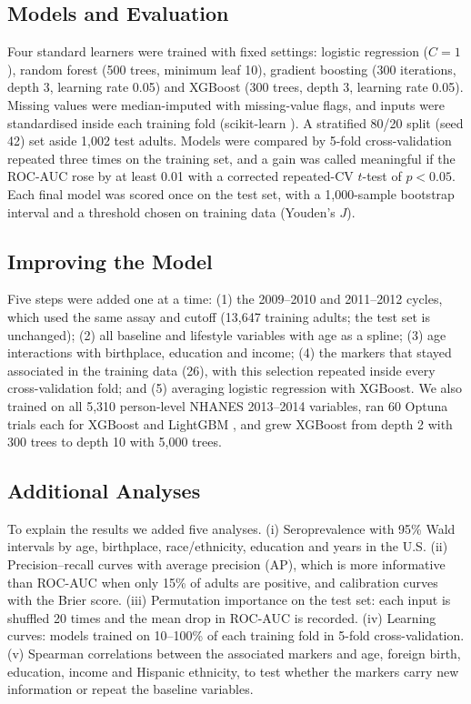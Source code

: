 \documentclass[conference]{IEEEtran}
\begin{document}
\subsection{Models and Evaluation}
Four standard learners were trained with fixed settings: logistic regression ($C=1$), random forest (500 trees, minimum leaf 10),
gradient boosting (300 iterations, depth 3, learning rate 0.05) and XGBoost \cite{xgboost} (300 trees, depth 3, learning rate 0.05).
Missing values were median-imputed with missing-value flags, and inputs were standardised inside each training fold (scikit-learn
\cite{sklearn}). A stratified 80/20 split (seed 42) set aside 1,002 test adults. Models were compared by 5-fold cross-validation
repeated three times on the training set, and a gain was called meaningful if the ROC-AUC rose by at least 0.01 with a corrected
repeated-CV $t$-test \cite{nadeau2003} of $p<0.05$. Each final model was scored once on the test set, with a 1,000-sample bootstrap
interval and a threshold chosen on training data (Youden's $J$).

\subsection{Improving the Model}
Five steps were added one at a time: (1) the 2009--2010 and 2011--2012 cycles, which used the same assay and cutoff (13,647 training
adults; the test set is unchanged); (2) all baseline and lifestyle variables with age as a spline; (3) age interactions with
birthplace, education and income; (4) the markers that stayed associated in the training data (26), with this selection
repeated inside every cross-validation fold; and (5) averaging logistic regression with XGBoost. We also trained on all 5,310 person-level NHANES 2013--2014 variables, ran 60 Optuna \cite{optuna} trials each for
XGBoost and LightGBM \cite{lightgbm}, and grew XGBoost from depth 2 with 300 trees to depth 10 with 5,000 trees.

\subsection{Additional Analyses}
To explain the results we added five analyses. (i) Seroprevalence with 95\% Wald intervals by age, birthplace, race/ethnicity,
education and years in the U.S. (ii) Precision--recall curves with average precision (AP), which is more informative than ROC-AUC when
only 15\% of adults are positive, and calibration curves with the Brier score. (iii) Permutation importance on the test set: each input
is shuffled 20 times and the mean drop in ROC-AUC is recorded. (iv) Learning curves: models trained on 10--100\% of each training
fold in 5-fold cross-validation. (v) Spearman correlations between the associated markers and age, foreign birth, education, income and
Hispanic ethnicity, to test whether the markers carry new information or repeat the baseline variables.
\end{document}
